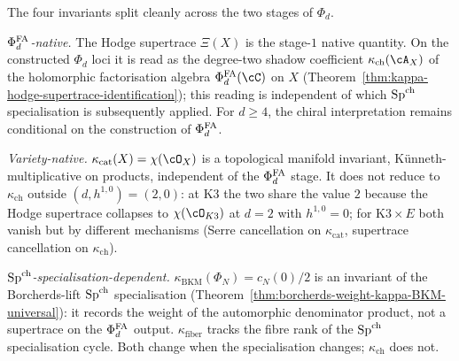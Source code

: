 \begin{remark}
\label{rem:comparison-four-kappas}
The four invariants split cleanly across the two stages of $\Phi_d$.

\emph{$\Phi^{\mathrm{FA}}_d$-native.} The Hodge supertrace $\Xi(X)$ is the
stage-$1$ native quantity. On the constructed $\Phi_d$ loci it is read as
the degree-two shadow coefficient
$\kappa_{\mathrm{ch}}(\cA_X)$ of the holomorphic factorisation algebra
$\PhiFA_d(\cC)$ on $X$ (Theorem~\ref{thm:kappa-hodge-supertrace-identification});
this reading is independent of which $\mathrm{Sp}^{\mathrm{ch}}$ specialisation is
subsequently applied. For \(d\geq4\), the chiral interpretation remains
conditional on the construction of \(\Phi^{\mathrm{FA}}_d\).

\emph{Variety-native.} $\kappa_{\mathrm{cat}}(X) = \chi(\cO_X)$ is a
topological manifold invariant, K\"unneth-multiplicative on products,
independent of the $\Phi^{\mathrm{FA}}_d$ stage. It does not reduce to
$\kappa_{\mathrm{ch}}$ outside $(d, h^{1,0}) = (2, 0)$: at K3 the two
share the value $2$ because the Hodge supertrace collapses to $\chi(\cO_{K3})$
at $d = 2$ with $h^{1,0} = 0$; for $\mathrm{K3} \times E$ both vanish
but by different mechanisms (Serre cancellation on $\kappa_{\mathrm{cat}}$,
supertrace cancellation on $\kappa_{\mathrm{ch}}$).

\emph{$\mathrm{Sp}^{\mathrm{ch}}$-specialisation-dependent.}
$\kappa_{\mathrm{BKM}}(\Phi_N) = c_N(0)/2$ is an invariant of the
Borcherds-lift $\mathrm{Sp}^{\mathrm{ch}}$ specialisation
(Theorem~\ref{thm:borcherds-weight-kappa-BKM-universal}): it records the
weight of the automorphic denominator product, not a supertrace on the
$\Phi^{\mathrm{FA}}_d$ output. $\kappa_{\mathrm{fiber}}$ tracks the fibre rank of the
$\mathrm{Sp}^{\mathrm{ch}}$ specialisation cycle. Both change when the specialisation changes;
$\kappa_{\mathrm{ch}}$ does not.
\end{remark}

